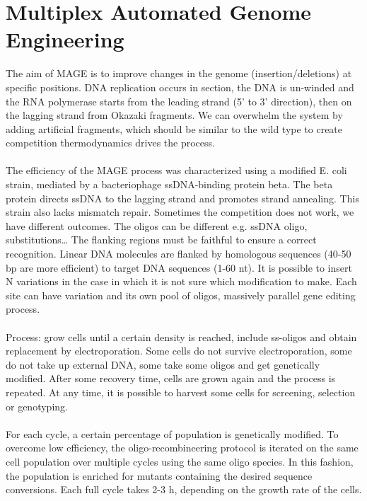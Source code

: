 \section{Multiplex Automated Genome Engineering}
The aim of MAGE is to improve changes in the genome (insertion/deletions) at specific positions. DNA replication occurs in section, the DNA is un-winded and the RNA polymerase starts from the leading strand (5’ to 3’ direction), then on the lagging strand from Okazaki fragments. We can overwhelm the system by adding artificial fragments, which should be similar to the wild type to create competition thermodynamics drives the process.
\\
\\
\noindent
The efficiency of the MAGE process was characterized using a modified E. coli strain, mediated by a bacteriophage ssDNA-binding protein beta. The beta protein directs ssDNA to the lagging strand and promotes strand annealing. This strain also lacks mismatch repair. Sometimes the competition does not work, we have different outcomes. The oligos can be different e.g. ssDNA oligo, substitutions… The flanking regions must be faithful to ensure a correct recognition.
Linear DNA molecules are flanked by homologous sequences (40-50 bp are more efficient) to target DNA sequences (1-60 nt). It is possible to insert N variations in the case in which it is not sure which modification to make. Each site can have variation and its own pool of oligos, massively parallel gene editing process.
\\
\\
\noindent
Process: grow cells until a certain density is reached, include ss-oligos and obtain replacement by electroporation. Some cells do not survive electroporation, some do not take up external DNA, some take some oligos and get genetically modified. After some recovery time, cells are grown again and the process is repeated. At any time, it is possible to harvest some cells for screening, selection or genotyping. 
\\
\\
\noindent
For each cycle, a certain percentage of population is genetically modified. To overcome low efficiency, the oligo-recombineering protocol is iterated on the same cell population over multiple cycles using the same oligo species. In this fashion, the population is enriched for mutants containing the desired sequence conversions. Each full cycle takes 2-3 h, depending on the growth rate of the cells. 
\\
\\

